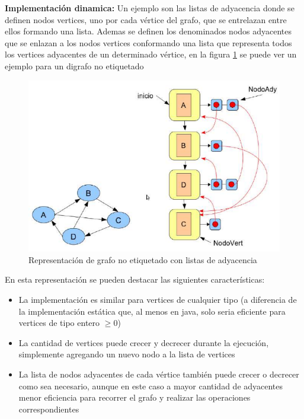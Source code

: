 \textbf{Implementación dinamica: }Un ejemplo son las listas de adyacencia donde se definen nodos vertices, uno por cada vértice del grafo, que se entrelazan entre ellos formando una lista. Ademas se definen los denominados nodos adyacentes que se enlazan a los nodos vertices conformando una lista que representa todos los vertices adyacentes de un determinado vértice, en la figura \ref{fig:ListaAdyacencia} se puede ver un ejemplo para un digrafo no etiquetado

\begin{figure}[!htb]
  \centering
  \includegraphics[width=\textwidth, scale=1]{Images/Punto1/ListaAdyacencia.png}
  \caption{Representación de grafo no etiquetado con listas de adyacencia}
  \label{fig:ListaAdyacencia}
\end{figure}

En esta representación se pueden destacar las siguientes características: 
\begin{itemize}
  \item La implementación es similar para vertices de cualquier tipo (a diferencia de la implementación estática que, al menos en java, solo seria eficiente para vertices de tipo entero $\geq 0$)
  \item La cantidad de vertices puede crecer y decrecer durante la ejecución, simplemente agregando un nuevo nodo a la lista de vertices
  \item La lista de nodos adyacentes de cada vértice también puede crecer o decrecer como sea necesario, aunque en este caso a mayor cantidad de adyacentes menor eficiencia para recorrer el grafo y realizar las operaciones correspondientes
\end{itemize}